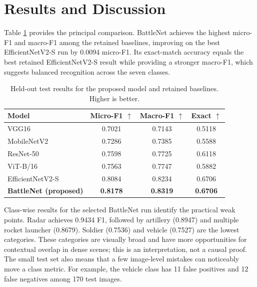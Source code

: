 \documentclass[conference]{IEEEtran}
\newcommand{\best}[1]{\textbf{#1}}
\begin{document}
\section{Results and Discussion}
Table \ref{tab:main-results} provides the principal comparison. BattleNet achieves the highest micro-F1 and macro-F1 among the retained baselines, improving on the best EfficientNetV2-S run by 0.0094 micro-F1. Its exact-match accuracy equals the best retained EfficientNetV2-S result while providing a stronger macro-F1, which suggests balanced recognition across the seven classes.

\begin{table}[t]
\caption{Held-out test results for the proposed model and retained baselines. Higher is better.}
\label{tab:main-results}
\centering
\footnotesize
\begin{tabular}{lccc}
\toprule
Model & Micro-F1 $\uparrow$ & Macro-F1 $\uparrow$ & Exact $\uparrow$\\
\midrule
VGG16 & 0.7021 & 0.7143 & 0.5118\\
MobileNetV2 & 0.7286 & 0.7385 & 0.5588\\
ResNet-50 & 0.7598 & 0.7725 & 0.6118\\
ViT-B/16 & 0.7563 & 0.7747 & 0.5882\\
EfficientNetV2-S & 0.8084 & 0.8234 & 0.6706\\
\best{BattleNet (proposed)} & \best{0.8178} & \best{0.8319} & \best{0.6706}\\
\bottomrule
\end{tabular}
\end{table}

Class-wise results for the selected BattleNet run identify the practical weak points. Radar achieves 0.9434 F1, followed by artillery (0.8947) and multiple rocket launcher (0.8679). Soldier (0.7536) and vehicle (0.7527) are the lowest categories. These categories are visually broad and have more opportunities for contextual overlap in dense scenes; this is an interpretation, not a causal proof. The small test set also means that a few image-level mistakes can noticeably move a class metric. For example, the vehicle class has 11 false positives and 12 false negatives among 170 test images.
\end{document}
